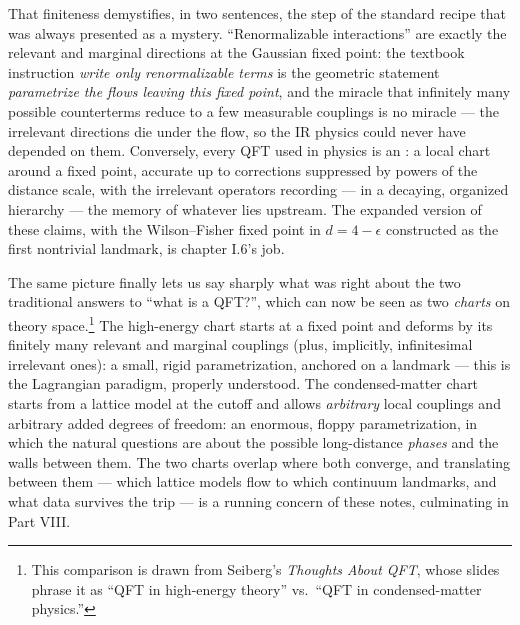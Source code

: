That finiteness demystifies, in two sentences, the step of the standard recipe
that was always presented as a mystery. ``Renormalizable interactions'' are
exactly the relevant and marginal directions at the Gaussian fixed point: the
textbook instruction \emph{write only renormalizable terms} is the geometric
statement \emph{parametrize the flows leaving this fixed point}, and the miracle
that infinitely many possible counterterms reduce to a few measurable couplings
is no miracle --- the irrelevant directions die under the flow, so the IR
physics could never have depended on them. Conversely, every QFT used in physics
is an : a local chart around a fixed point,
accurate up to corrections suppressed by powers of the distance scale, with the
irrelevant operators recording --- in a decaying, organized hierarchy --- the
memory of whatever lies upstream. The expanded version of these claims, with the
Wilson--Fisher fixed point in $d = 4 - \epsilon$ constructed as the first
nontrivial landmark, is chapter I.6's job.

The same picture finally lets us say sharply what was right about the two
traditional answers to ``what is a QFT?'', which can now be seen as two
\emph{charts} on theory space.\footnote{This comparison is drawn from Seiberg's
\emph{Thoughts About QFT}, whose slides phrase it as ``QFT in high-energy
theory'' vs.\ ``QFT in condensed-matter physics.''} The high-energy chart starts
at a fixed point and deforms by its finitely many relevant and marginal
couplings (plus, implicitly, infinitesimal irrelevant ones): a small, rigid
parametrization, anchored on a landmark --- this is the Lagrangian paradigm,
properly understood. The condensed-matter chart starts from a lattice model at
the cutoff and allows \emph{arbitrary} local couplings and arbitrary added
degrees of freedom: an enormous, floppy parametrization, in which the natural
questions are about the possible long-distance \emph{phases} and the walls
between them. The two charts overlap where both converge, and translating
between them --- which lattice models flow to which continuum landmarks, and
what data survives the trip --- is a running concern of these notes,
culminating in Part VIII.

